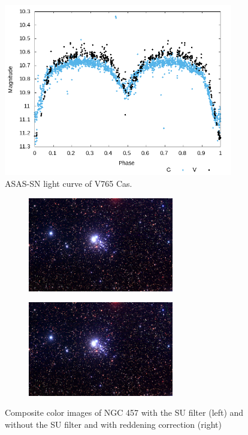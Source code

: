 \documentclass[linenumbers]{aastex631}
\begin{document}
\begin{figure}[H]
\centering
\includegraphics[width=10cm]{Figures/V765Cas-ASAS-SN-Lightcurve.png}
\caption{ASAS-SN light curve of V765 Cas.} 
\label{fig:asassnlightcurve}
\end{figure}

\begin{figure}[htb!]
  \centering
  \begin{subfigure}{}
    \includegraphics[width=2.5in]{Figures/NGC457-Composite-Image-withSU.png}
  \end{subfigure} 
  \begin{subfigure}{}
    \includegraphics[width=2.5in]{Figures/NGC457-Composite-Image-withoutSU-withRcorrec.png}
  \end{subfigure}
  \label{colorcomposites}
  \caption{Composite color images of NGC 457 with the SU filter (left) and without the SU filter and with reddening correction (right)}
\end{figure}
\end{document}
